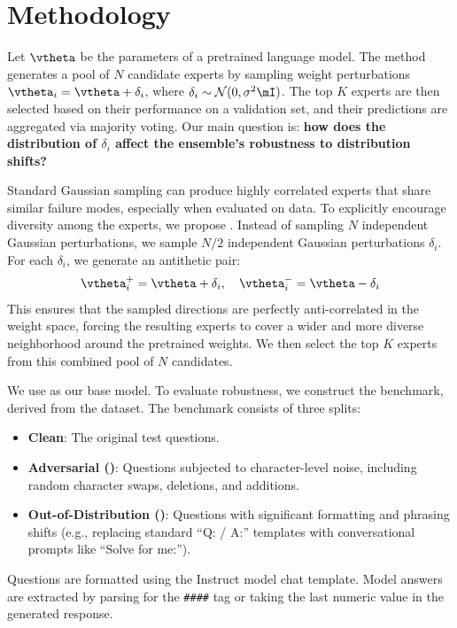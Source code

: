 \section{Methodology}

Let $\vtheta$ be the parameters of a pretrained language model. The \randopt method \citep{gan2026neural} generates a pool of $N$ candidate experts by sampling weight perturbations $\vtheta_i = \vtheta + \delta_i$, where $\delta_i \sim \mathcal{N}(0, \sigma^2 \mI)$. The top $K$ experts are then selected based on their performance on a validation set, and their predictions are aggregated via majority voting. Our main question is: {\bf how does the distribution of $\delta_i$ affect the ensemble's robustness to distribution shifts?}

Standard Gaussian sampling can produce highly correlated experts that share similar failure modes, especially when evaluated on \ood data. To explicitly encourage diversity among the experts, we propose \methodname. Instead of sampling $N$ independent Gaussian perturbations, we sample $N/2$ independent Gaussian perturbations $\delta_i$. For each $\delta_i$, we generate an antithetic pair:
\begin{equation}
    \vtheta_i^+ = \vtheta + \delta_i, \quad \vtheta_i^- = \vtheta - \delta_i
\end{equation}
This ensures that the sampled directions are perfectly anti-correlated in the weight space, forcing the resulting experts to cover a wider and more diverse neighborhood around the pretrained weights. We then select the top $K$ experts from this combined pool of $N$ candidates.

We use \qwen as our base model. To evaluate robustness, we construct the \rgsm benchmark, derived from the \gsm dataset. The benchmark consists of three splits:
\begin{itemize}[leftmargin=*,itemsep=0pt,topsep=0pt]
    \item \textbf{Clean}: The original \gsm test questions.
    \item \textbf{Adversarial (\adv)}: Questions subjected to character-level noise, including random character swaps, deletions, and additions.
    \item \textbf{Out-of-Distribution (\ood)}: Questions with significant formatting and phrasing shifts (e.g., replacing standard ``Q: / A:'' templates with conversational prompts like ``Solve for me:'').
\end{itemize}
Questions are formatted using the Instruct model chat template. Model answers are extracted by parsing for the \texttt{\#\#\#\#} tag or taking the last numeric value in the generated response.

